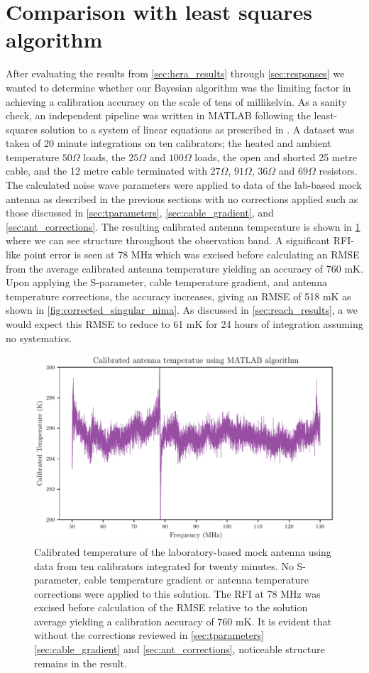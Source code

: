 \section{Comparison with least squares algorithm}\label{sec:matlab_results}
After evaluating the results from \cref{sec:hera_results} through \cref{sec:responses} we wanted to determine whether our Bayesian algorithm was the limiting factor in achieving a calibration accuracy on the scale of tens of millikelvin. As a sanity check, an independent pipeline was written in MATLAB following the least-squares solution to a system of linear equations as prescribed in \citet{edgesCal}. A dataset was taken of 20 minute integrations on ten calibrators; the heated and ambient temperature $50 \Omega$ loads, the $25 \Omega$ and $100 \Omega$ loads, the open and shorted 25 metre cable, and the 12 metre cable terminated with $27 \Omega$, $91 \Omega$, $36 \Omega$ and $69 \Omega$ resistors. The calculated noise wave parameters were applied to data of the lab-based mock antenna as described in the previous sections with no corrections applied such as those discussed in \cref{sec:tparameters}, \cref{sec:cable_gradient}, and \cref{sec:ant_corrections}. The resulting calibrated antenna temperature is shown in \cref{fig:raw_singular_nima} where we can see structure throughout the observation band. A significant RFI-like point error is seen at 78 MHz which was excised before calculating an RMSE from the average calibrated antenna temperature yielding an accuracy of 760 mK. Upon applying the S-parameter, cable temperature gradient, and antenna temperature corrections, the accuracy increases, giving an RMSE of 518 mK as shown in \cref{fig:corrected_singular_nima}. As discussed in \cref{sec:reach_results}, a we would expect this RMSE to reduce to 61 mK for 24 hours of integration assuming no systematics.
\begin{figure}
    \centering
    \includegraphics[width=.8\textwidth]{raw_matlab_solution}
    \caption{Calibrated temperature of the laboratory-based mock antenna using data from ten calibrators integrated for twenty minutes. No S-parameter, cable temperature gradient or antenna temperature corrections were applied to this solution. The RFI at 78 MHz was excised before calculation of the RMSE relative to the solution average yielding a calibration accuracy of 760 mK. It is evident that without the corrections reviewed in \cref{sec:tparameters} \cref{sec:cable_gradient} and \cref{sec:ant_corrections}, noticeable structure remains in the result.}
    \label{fig:raw_singular_nima}
\end{figure}
